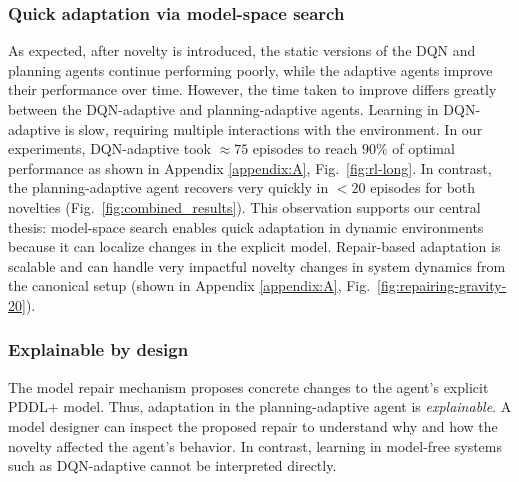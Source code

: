 \documentclass[letterpaper]{article} %
\begin{document}
\subsubsection{Quick adaptation via model-space search} As expected, after novelty is introduced, the static versions of the DQN and planning agents continue performing poorly, while the adaptive agents improve their performance over time. However, the time taken to improve differs greatly between the DQN-adaptive and planning-adaptive agents. 
Learning in DQN-adaptive is slow, requiring multiple interactions with the environment. In our experiments, DQN-adaptive took $\approx75$ episodes to reach $90\%$ of optimal performance as shown in Appendix \ref{appendix:A}, Fig.~\ref{fig:rl-long}. In contrast, the planning-adaptive agent recovers very quickly in $<20$ episodes for both novelties (Fig.~\ref{fig:combined_results}). This observation supports our central thesis: model-space search enables quick adaptation in dynamic environments because it can localize changes in the explicit model. Repair-based adaptation is scalable and can handle very impactful novelty changes in system dynamics from the canonical setup (shown in Appendix \ref{appendix:A}, Fig.~\ref{fig:repairing-gravity-20}). 

\subsubsection{Explainable by design}
The model repair mechanism proposes concrete changes to the agent's explicit PDDL+ model. Thus, adaptation in the planning-adaptive agent is \emph{explainable}. A model designer can inspect the proposed repair to understand why and how the novelty affected the agent's behavior. In contrast, learning in model-free systems such as DQN-adaptive cannot be interpreted directly. 
\end{document}
